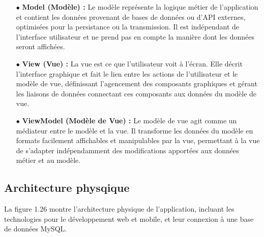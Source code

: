 \begin{itemize}
    \item[$\bullet$] \textbf{Model (Modèle) :}
          Le modèle représente la logique métier de l'application et contient les données provenant de bases de données ou d'API externes, optimisées pour la persistance ou la transmission. Il est indépendant de l'interface utilisateur et ne prend pas en compte la manière dont les données seront affichées.
    \item[$\bullet$] \textbf{View (Vue) :}
          La vue est ce que l'utilisateur voit à l'écran. Elle décrit l'interface graphique et fait le lien entre les actions de l'utilisateur et le modèle de vue, définissant l'agencement des composants graphiques et gérant les liaisons de données connectant ces composants aux données du modèle de vue.
    \item[$\bullet$] \textbf{ViewModel (Modèle de Vue) :}
          Le modèle de vue agit comme un médiateur entre le modèle et la vue. Il transforme les données du modèle en formats facilement affichables et manipulables par la vue, permettant à la vue de s'adapter indépendamment des modifications apportées aux données métier et au modèle.


\end{itemize}

\subsection{Architecture physqique}

La figure 1.26 montre l'architecture physique de l'application, incluant les technologies pour le développement web et mobile, et leur connexion à une base de données MySQL.\\

